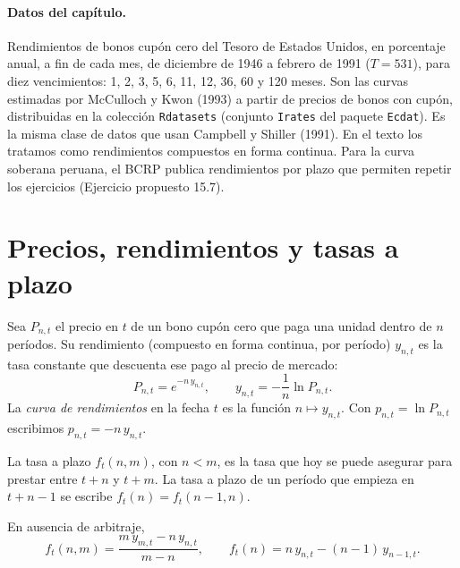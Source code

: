 \paragraph{Datos del capítulo.} Rendimientos de bonos cupón cero del Tesoro de Estados Unidos, en porcentaje anual, a
fin de cada mes, de diciembre de 1946 a febrero de 1991 ($T=531$), para diez vencimientos: 1, 2, 3, 5, 6, 11, 12, 36, 60
y 120 meses. Son las curvas estimadas por McCulloch y Kwon (1993) a partir de precios de bonos con cupón, distribuidas en
la colección \texttt{Rdatasets} (conjunto \texttt{Irates} del paquete \texttt{Ecdat}). Es la misma clase de datos que usan
Campbell y Shiller (1991). En el texto los tratamos como rendimientos compuestos en forma continua. Para la curva soberana
peruana, el BCRP publica rendimientos por plazo que permiten repetir los ejercicios (Ejercicio propuesto 15.7).

\section{Precios, rendimientos y tasas a plazo}

Sea $P_{n,t}$ el precio en $t$ de un bono cupón cero que paga una unidad dentro de $n$ períodos. Su rendimiento
(compuesto en forma continua, por período) $y_{n,t}$ es la tasa constante que descuenta ese pago al precio de mercado:
\[
  P_{n,t}=e^{-n\,y_{n,t}},\qquad y_{n,t}=-\frac{1}{n}\ln P_{n,t}.
\]
La \emph{curva de rendimientos} en la fecha $t$ es la función $n\mapsto y_{n,t}$. Con $p_{n,t}=\ln P_{n,t}$ escribimos
$p_{n,t}=-n\,y_{n,t}$.

\begin{definicion}
La tasa a plazo $f_t(n,m)$, con $n<m$, es la tasa que hoy se puede asegurar para prestar entre $t+n$ y $t+m$. La tasa a
plazo de un período que empieza en $t+n-1$ se escribe $f_t(n)=f_t(n-1,n)$.
\end{definicion}

\begin{proposicion}\label{prop:plazo}
En ausencia de arbitraje,
\[
  f_t(n,m)=\frac{m\,y_{m,t}-n\,y_{n,t}}{m-n},\qquad f_t(n)=n\,y_{n,t}-(n-1)\,y_{n-1,t}.
\]
\end{proposicion}

